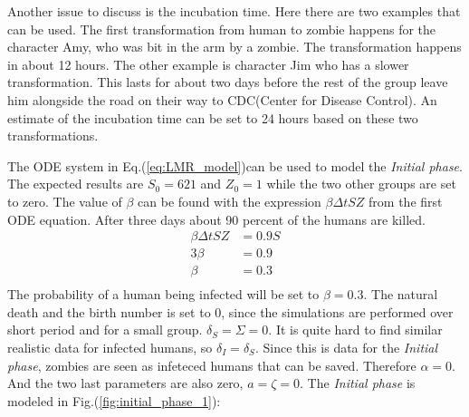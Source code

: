 \documentclass[%
twoside,                 %
final,                   %
chapterprefix=true,      %
open=right               %
10pt]{book}
\begin{document}
\vspace{3mm}




\vspace{3mm}


Another issue to discuss is the incubation time. Here there are two examples that can be used. The first transformation from human to zombie happens for the character Amy, who was bit in the arm by a zombie. The transformation happens in about 12 hours. The other example is character Jim who has a slower transformation. This lasts for about two days before the rest of the group leave him alongside the road on their way to CDC(Center for Disease Control). An estimate of the incubation time can be set to 24 hours based on these two transformations.


\vspace{3mm}




\vspace{3mm}


The ODE system in Eq.(\ref{eq:LMR_model})can be used to model the \emph{Initial phase}. The expected results are $S_0 = 621$ and $Z_0 = 1$ while the two other groups are set to zero. The value of $\beta$ can be found with the expression $\beta \Delta t S Z$ from the first ODE equation. After three days about 90 percent of the humans are killed.
\begin{equation}
	\begin{aligned}
	\beta\Delta t S Z &= 0.9 S\\
	3\beta   &= 0.9 \\
	\beta &= 0.3 \\
	\end{aligned}
\end{equation}
The probability of a human being infected will be set to $\beta = 0.3$. The natural death and the birth number is set to 0, since the simulations are performed over short period and for a small group. $\delta_S = \Sigma = 0$. It is quite hard to find similar realistic data for infected humans, so $\delta_I = \delta_S$. Since this is data for the \emph{Initial phase}, zombies are seen as infeteced humans that can be saved. Therefore $\alpha = 0$. And the two last parameters are also zero, $a = \zeta = 0$. The \emph{Initial phase} is modeled in Fig.(\ref{fig:initial_phase_1}):


\vspace{3mm}




\vspace{3mm}
\end{document}
